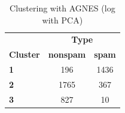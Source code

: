 \documentclass{article}
\begin{document}
	\begin{table}[h]
		\centering
		\begin{tabular}{lcc}
			& \multicolumn{2}{c}{\textbf{Type}} \\
			\textbf{Cluster} & \textbf{nonspam} & \textbf{spam} \\
			\textbf{1} & 196 & 1436 \\
			\textbf{2} & 1765 & 367 \\
			\textbf{3} & 827 & 10 \\
		\end{tabular}
		\caption{Clustering with AGNES (log with PCA)}
		\label{tab::clust_agnes_log_pca}
	\end{table}
\end{document}
